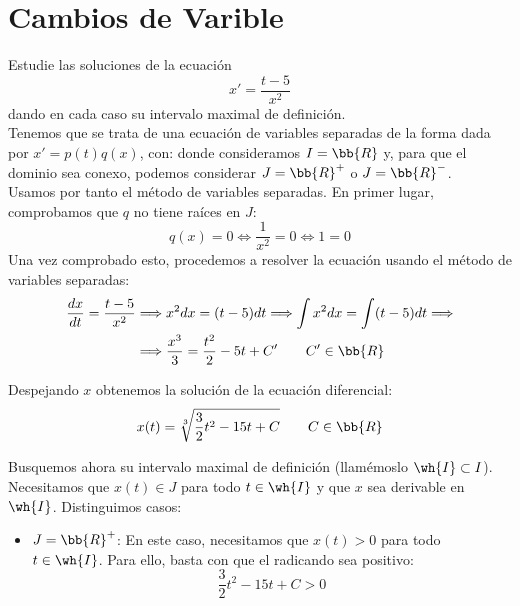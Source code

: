\section{Cambios de Varible}

\begin{ejercicio}
    Estudie las soluciones de la ecuación
    \begin{equation*}
        x' = \dfrac{t-5}{x^2}
    \end{equation*}
    dando en cada caso su intervalo maximal de definición.\\

    Tenemos que se trata de una ecuación de variables separadas de la forma dada por $x' = p(t)q(x)$, con:
    donde consideramos $I=\bb{R}$ y, para que el dominio sea conexo, podemos considerar $J=\bb{R}^+$ o $J=\bb{R}^-$.\\

    Usamos por tanto el método de variables separadas. En primer lugar, comprobamos que $q$ no tiene raíces en $J$:
    \begin{equation*}
        q(x)=0 \Longleftrightarrow \dfrac{1}{x^2}=0 \Longleftrightarrow 1=0
    \end{equation*}
    Una vez comprobado esto, procedemos a resolver la ecuación usando el método de variables separadas:
    \begin{align*}
        \dfrac{dx}{dt} = \dfrac{t-5}{x^2} &\Longrightarrow x^2dx = (t-5)dt \Longrightarrow \int x^2dx = \int (t-5)dt \Longrightarrow \\ &\Longrightarrow \dfrac{x^3}{3} = \dfrac{t^2}{2} - 5t + C' \qquad C'\in \bb{R}
    \end{align*}

    Despejando $x$ obtenemos la solución de la ecuación diferencial:
    \begin{equation*}
        x(t) = \sqrt[3]{\dfrac{3}{2}t^2 - 15t + C} \qquad C\in \bb{R}
    \end{equation*}

    Busquemos ahora su intervalo maximal de definición (llamémoslo $\wh{I}\subset I$). Necesitamos que $x(t)\in J$ para todo $t\in \wh{I}$ y que $x$ sea derivable en $\wh{I}$. Distinguimos casos:
    \begin{itemize}
        \item \ul{$J=\bb{R}^+$}: En este caso, necesitamos que $x(t)>0$ para todo $t\in \wh{I}$. Para ello, basta con que el radicando sea positivo:
        \begin{equation*}
            \dfrac{3}{2}t^2 - 15t + C > 0
        \end{equation*}


\end{itemize}
\end{ejercicio}
